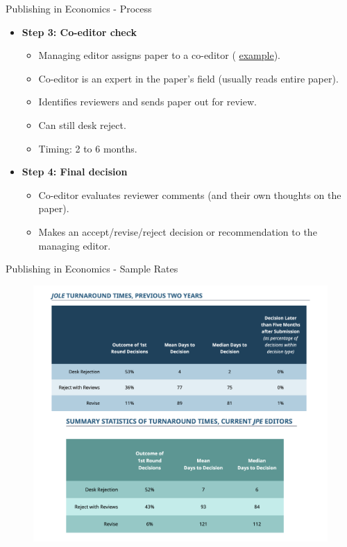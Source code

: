 \documentclass{beamer}
\begin{document}
\begin{frame}{Publishing in Economics - Process}
\begin{itemize}
    \item \textbf{Step 3: Co-editor check}
    \begin{itemize}
        \item Managing editor assigns paper to a co-editor (\color{blue} \href{https://www.aeaweb.org/journals/aer/about-aer/editors}{example}\color{black}).
        \item Co-editor is an expert in the paper's field (usually reads entire paper).
        \item Identifies reviewers and sends paper out for review.
        \item Can still desk reject.
        \item Timing: 2 to 6 months.
    \end{itemize}
\medskip
    \pause \item \textbf{Step 4: Final decision}
    \begin{itemize}
        \item Co-editor evaluates reviewer comments (and their own thoughts on the paper). 
        \item Makes an accept/revise/reject decision or recommendation to the managing editor.
    \end{itemize}
\end{itemize}
\end{frame}

\begin{frame}{Publishing in Economics - Sample Rates}
    \begin{figure}
        \includegraphics[scale=0.35]{images/rates.png}
    \end{figure}      
\end{frame}
\end{document}

